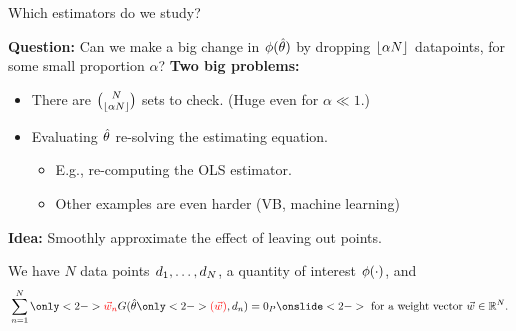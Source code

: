 
\begin{frame}[t]{Which estimators do we study?}

\textbf{Question: }
Can we make a big change in $\phi(\hat{\theta})$ by dropping
$\lfloor \alpha N \rfloor$ datapoints, for some small proportion $\alpha$?
%
\textbf{Two big problems:}
%
\begin{itemize}
    \item There are ${N \choose \lfloor \alpha N \rfloor}$
        sets to check. (Huge even for $\alpha \ll 1$.)
    \item Evaluating $\hat{\theta}$ re-solving the estimating equation.
        \begin{itemize}
        \item E.g., re-computing the OLS estimator.
        \item Other examples are even harder (VB, machine learning)
        \end{itemize}
\end{itemize}
%
\textbf{Idea: }Smoothly approximate the effect of leaving out points.

\hrulefill

We have $N$ data points $d_{1}, \ldots, d_{N}$, a quantity of interest
$\phi(\cdot)$, and
%
\begin{align*}
%
\sumn
\only<2->{\color{red} \w_n \color{black}}
G(
\thetahat\only<2->{\color{red} (\w) \color{black}}
, \d_{n}) =  \zP
\onslide<2->{\textrm{ for a weight vector }\w \in \mathbb{R}^N}.
%
\end{align*}



\end{frame}
